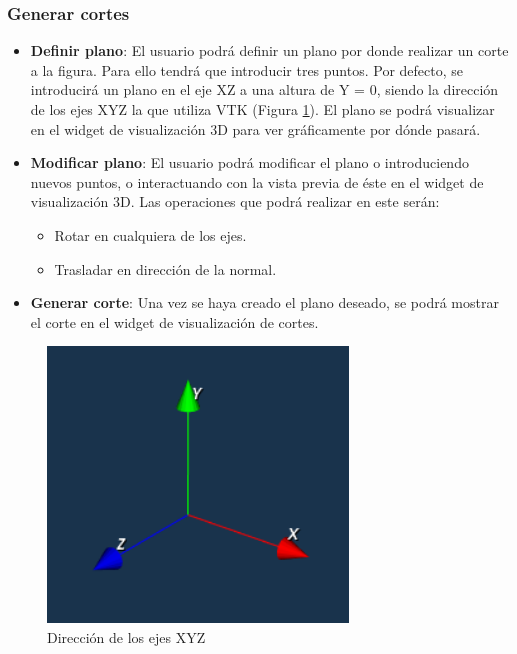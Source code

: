 \subsubsection{Generar cortes}
\begin{itemize}
	\item \textbf{Definir plano}: El usuario podrá definir un plano por donde realizar un corte a la figura. Para ello tendrá que introducir tres puntos. Por defecto, se introducirá un plano en el eje XZ a una altura de Y = 0, siendo la dirección de los ejes XYZ la que utiliza VTK (Figura \ref{fig:vtk_axes}). El plano se podrá visualizar en el widget de visualización 3D para ver gráficamente por dónde pasará.
	\item \textbf{Modificar plano}: El usuario podrá modificar el plano o introduciendo nuevos puntos, o interactuando con la vista previa de éste en el widget de visualización 3D. Las operaciones que podrá realizar en este serán:
	\begin{itemize}
		\item Rotar en cualquiera de los ejes.
		\item Trasladar en dirección de la normal.
	\end{itemize}
	\item \textbf{Generar corte}: Una vez se haya creado el plano deseado, se podrá mostrar el corte en el widget de visualización de cortes.
\end{itemize}

\begin{figure}[H]
	\centering
	\includegraphics[width=8cm]{imagenes/vtk_axes}
	\caption{Dirección de los ejes XYZ}
	\label{fig:vtk_axes}
\end{figure}

